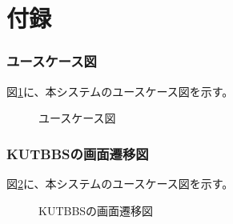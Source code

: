 \documentclass[a4j]{jarticle}
\begin{document}
% 
%
%
%
\newpage
\appendix
\part*{付録}

\setcounter{section}{0} %
\renewcommand{\thesection}{\Alph{section}} %
\setcounter{figure}{0} %
\renewcommand{\thefigure}{\Alph{section}}


\section{ユースケース図}
図\ref{UseCase:UseCasetest}に、本システムのユースケース図を示す。
\begin{figure}[H]
\begin{center}
\caption{ユースケース図}
\label{UseCase:UseCasetest}
\end{center}
\end{figure}

\section{KUTBBSの画面遷移図}
図\ref{fig:Screen_transition}に、本システムのユースケース図を示す。
\label{fig:Screen_transition}
\begin{figure}[H]
\centering
{}
\caption{KUTBBSの画面遷移図}
\label{fig:Screen_transition}
\end{figure}
\end{document}
